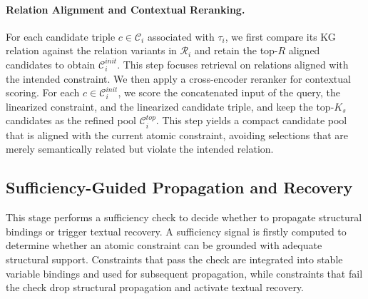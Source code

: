 \documentclass{article}
\theoremstyle{plain}
\theoremstyle{definition}
\theoremstyle{remark}
\begin{document}
\paragraph{Relation Alignment and Contextual Reranking.}
For each candidate triple $c\in\mathcal{C}_i$ associated with $\tau_i$,
we first compare its KG relation against the relation variants in $\mathcal{R}_i$ and retain the top-$R$ aligned candidates to obtain $\mathcal{C}_i^{init}$.
This step focuses retrieval on relations aligned with the intended constraint.
We then apply a cross-encoder reranker for contextual scoring.
For each $c\in\mathcal{C}_i^{init}$, we score the concatenated input of the query, the linearized constraint, and the linearized candidate triple, and keep the top-$K_s$ candidates as the refined pool $\mathcal{C}_i^{top}$.
This step yields a compact candidate pool that is aligned with the current atomic constraint, avoiding selections that are merely semantically related but violate the intended relation.


\subsection{Sufficiency-Guided Propagation and Recovery}
This stage performs a sufficiency check to decide whether to propagate structural bindings or trigger textual recovery.
A sufficiency signal is firstly computed to determine whether an atomic constraint can be grounded with adequate structural support.
Constraints that pass the check are integrated into stable variable bindings and used for subsequent propagation, while constraints that fail the check drop structural propagation and activate textual recovery.
\end{document}
